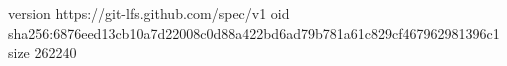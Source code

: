 version https://git-lfs.github.com/spec/v1
oid sha256:6876eed13cb10a7d22008c0d88a422bd6ad79b781a61c829cf467962981396c1
size 262240
